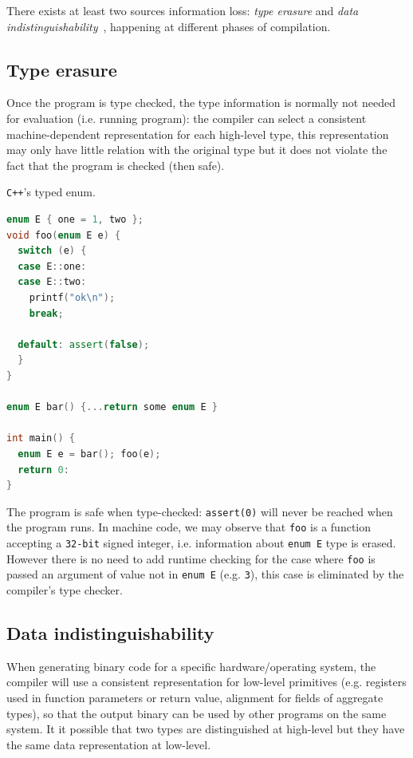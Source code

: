 \documentclass[a4paper]{llncs}
\begin{document}
There exists at least two sources information loss: \emph{type erasure} and
\emph{data indistinguishability}~\cite{noauthor_struct_nodate}, happening at
different phases of compilation.

\subsection{Type erasure}
Once the program is type checked, the type information is normally not needed for
evaluation (i.e. running program): the compiler can select a consistent machine-dependent
representation for each high-level type, this representation may only have little
relation with the original type but it does not violate the fact that the program
is checked (then safe).

\begin{example}\label{exa:typed_enum}
\texttt{C++}'s typed enum.

\begin{lstlisting}[frame=lines, language={C++}]
enum E { one = 1, two };
void foo(enum E e) {
  switch (e) {
  case E::one:
  case E::two:
    printf("ok\n");
    break;

  default: assert(false);
  }
}

enum E bar() {...return some enum E }

int main() {
  enum E e = bar(); foo(e);
  return 0:
}
\end{lstlisting}

The program is safe when type-checked: \texttt{assert(0)} will
never be reached when the program runs. In machine code, we may observe that
\texttt{foo} is a function accepting a \texttt{32-bit} signed integer, i.e. information about
\texttt{enum E} type is erased. However there is no need to add runtime
checking for the case where \texttt{foo} is passed an argument of value not in \texttt{enum E}
(e.g. \texttt{3}), this case is eliminated by the compiler's type checker.
\end{example}

\subsection{Data indistinguishability}
When generating binary code for a specific hardware/operating system, the compiler will
use a consistent representation for low-level primitives (e.g. registers used in
function parameters or return value, alignment for fields of aggregate types), so that
the output binary can be used by other programs on the same system. It it possible that
two types are distinguished at high-level but they have the same data representation
at low-level.
\end{document}
